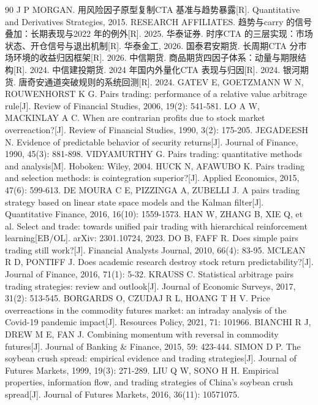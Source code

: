 \documentclass[12pt,a4paper]{ctexart}
\begin{document}
\begin{thebibliography}{90}
 J P MORGAN. 用风险因子原型复制CTA 基准与趋势暴露[R]. Quantitative and Derivatives Strategies, 2015.
 RESEARCH AFFILIATES. 趋势与carry 的信号叠加：长期表现与2022 年的例外[R]. 2025.
 华泰证券. 时序CTA 的三层实现：市场状态、开仓信号与退出机制[R]. 华泰金工, 2026.
 国泰君安期货. 长周期CTA 分市场环境的收益归因框架[R]. 2026.
 中信期货. 商品期货四因子体系：动量与期限结构[R]. 2024.
 中信建投期货. 2024 年国内外量化CTA 表现与归因[R]. 2024.
 银河期货. 唐奇安通道突破规则的系统回测[R]. 2024.
 GATEV E, GOETZMANN W N, ROUWENHORST K G. Pairs trading: performance of a relative value arbitrage rule[J]. Review of Financial Studies, 2006, 19(2): 541-581.
 LO A W, MACKINLAY A C. When are contrarian profits due to stock market overreaction?[J]. Review of Financial Studies, 1990, 3(2): 175-205.
 JEGADEESH N. Evidence of predictable behavior of security returns[J]. Journal of Finance, 1990, 45(3): 881-898.
 VIDYAMURTHY G. Pairs trading: quantitative methods and analysis[M]. Hoboken: Wiley, 2004.
 HUCK N, AFAWUBO K. Pairs trading and selection methods: is cointegration superior?[J]. Applied Economics, 2015, 47(6): 599-613.
 DE MOURA C E, PIZZINGA A, ZUBELLI J. A pairs trading strategy based on linear state space models and the Kalman filter[J]. Quantitative Finance, 2016, 16(10): 1559-1573.
 HAN W, ZHANG B, XIE Q, et al. Select and trade: towards unified pair trading with hierarchical reinforcement learning[EB/OL]. arXiv: 2301.10724, 2023.
 DO B, FAFF R. Does simple pairs trading still work?[J]. Financial Analysts Journal, 2010, 66(4): 83-95.
 MCLEAN R D, PONTIFF J. Does academic research destroy stock return predictability?[J]. Journal of Finance, 2016, 71(1): 5-32.
 KRAUSS C. Statistical arbitrage pairs trading strategies: review and outlook[J]. Journal of Economic Surveys, 2017, 31(2): 513-545.
 BORGARDS O, CZUDAJ R L, HOANG T H V. Price overreactions in the commodity futures market: an intraday analysis of the Covid-19 pandemic impact[J]. Resources Policy, 2021, 71: 101966.
 BIANCHI R J, DREW M E, FAN J. Combining momentum with reversal in commodity futures[J]. Journal of Banking \& Finance, 2015, 59: 423-444.
 SIMON D P. The soybean crush spread: empirical evidence and trading strategies[J]. Journal of Futures Markets, 1999, 19(3): 271-289.
 LIU Q W, SONO H H. Empirical properties, information flow, and trading strategies of China’s soybean crush spread[J]. Journal of Futures Markets, 2016, 36(11): 10571075.

\end{thebibliography}
\end{document}
